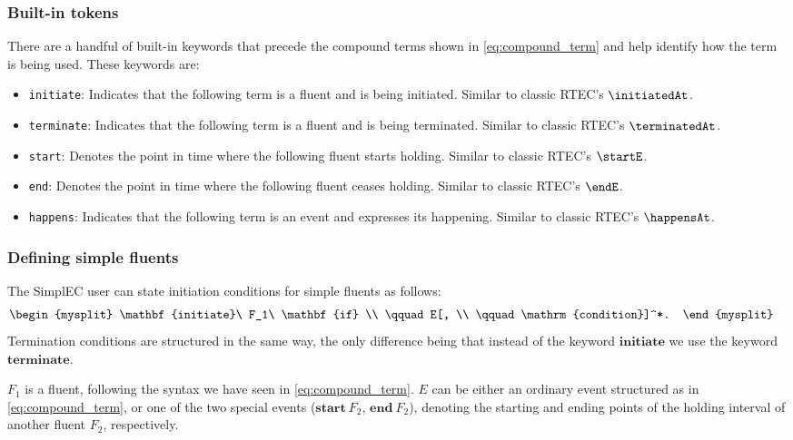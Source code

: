 \subsubsection{Built-in tokens}

There are a handful of built-in keywords that precede the compound terms shown in \ref{eq:compound_term} and help identify how the term is being used. These keywords are:
\begin{itemize}
\item \texttt{initiate}: Indicates that the following term is a fluent and is being initiated. Similar to classic RTEC's $\initiatedAt$.
\item \texttt{terminate}: Indicates that the following term is a fluent and is being terminated. Similar to classic RTEC's $\terminatedAt$.
\item \texttt{start}: Denotes the point in time where the following fluent starts holding. Similar to classic RTEC's $\startE$.
\item \texttt{end}: Denotes the point in time where the following fluent ceases holding. Similar to classic RTEC's $\endE$.
\item \texttt{happens}: Indicates that the following term is an event and expresses its happening. Similar to classic RTEC's $\happensAt$.
\end{itemize}

\subsubsection{Defining simple fluents}

The SimplEC user can state initiation conditions for simple fluents as follows:
%
\begin{align}
& \label{eq:simple_fluent}
\begin{mysplit}
\mathbf{initiate}\ F_1\ \mathbf{if} \\
\qquad E[, \\
\qquad \mathrm{condition}]^*.
\end{mysplit}
\end{align}
%
Termination conditions are structured in the same way, the only difference being that instead of the keyword $\mathbf{initiate}$ we use the keyword $\mathbf{terminate}$.

$F_1$ is a fluent, following the syntax we have seen in \eqref{eq:compound_term}. $E$ can be either an ordinary event structured as in \eqref{eq:compound_term}, or one of the two special events ($\mathbf{start}\ F_2$, $\mathbf{end}\ F_2$), denoting the starting and ending points of the holding interval of another fluent $F_2$, respectively.

